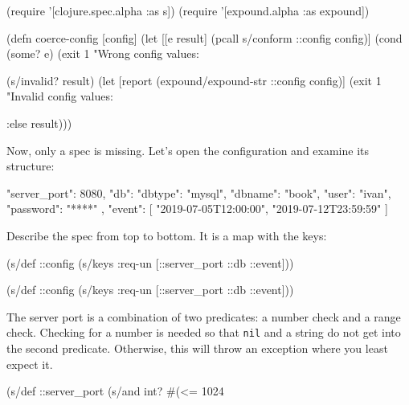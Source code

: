 \else

\begin{clojure}
(require '[clojure.spec.alpha :as s])
(require '[expound.alpha :as expound])

(defn coerce-config [config]
  (let [[e result] (pcall s/conform ::config config)]
    (cond
      (some? e)
      (exit 1 "Wrong config values: %

      (s/invalid? result)
      (let [report (expound/expound-str ::config config)]
        (exit 1 "Invalid config values: %

      :else result)))
\end{clojure}

\fi

Now, only a spec is missing. Let's open the configuration and examine its structure:


\begin{json}
{
    "server_port": 8080,
    "db": {
        "dbtype":   "mysql",
        "dbname":   "book",
        "user":     "ivan",
        "password": "****"
    },
    "event": [
        "2019-07-05T12:00:00",
        "2019-07-12T23:59:59"
    ]
}
\end{json}

Describe the spec from top to bottom. It is a map with the keys:

\ifnarrow

\begin{clojure}
(s/def ::config
  (s/keys :req-un [::server_port
                   ::db ::event]))
\end{clojure}

\else

\begin{clojure}
(s/def ::config
  (s/keys :req-un [::server_port ::db ::event]))
\end{clojure}

\fi


The server port is a combination of two predicates: a number check and a range check. Checking for a number is needed so that \verb|nil| and a string do not get into the second predicate. Otherwise, this will throw an exception where you least expect it.

\begin{clojure}
(s/def ::server_port
  (s/and int? #(<= 1024 %
\end{clojure}


